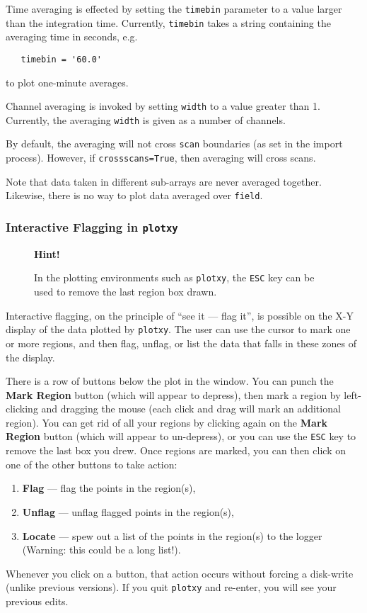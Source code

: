 Time averaging is effected by setting the {\tt timebin} parameter to a
value larger than the integration time.  Currently, {\tt timebin}
takes a string containing the averaging time in seconds, e.g.
\small
\begin{verbatim}
   timebin = '60.0'
\end{verbatim}
\normalsize
to plot one-minute averages.

Channel averaging is invoked by setting {\tt width} to a value greater
than 1.  Currently, the averaging {\tt width} is given as a number of
channels.

By default, the averaging will not cross {\tt scan} boundaries (as set
in the import process).  However, if {\tt crossscans=True}, then
averaging will cross scans.  

Note that data taken in different sub-arrays are never averaged
together. Likewise, there is no way to plot data averaged over {\tt field}.

\subsubsection{Interactive Flagging in {\tt plotxy}}
\label{section:edit.plot.plotxy.flag}

\begin{wrapfigure}{r}{2.5in}
  \begin{boxedminipage}{2.5in}
     \centerline{\bf Hint!}
     In the plotting environments such as {\tt plotxy}, the
     {\tt ESC} key can be used to remove the last region box
     drawn. 
  \end{boxedminipage}
\end{wrapfigure}

Interactive flagging, on the principle of ``see it --- flag it'', is
possible on the X-Y display of the data plotted by {\tt plotxy}.  The user can
use the cursor to mark one or more regions, and then flag, unflag, or list
the data that falls in these zones of the display.

There is a row of buttons below the plot in the window.  You can punch the
{\bf Mark Region} button (which will appear to depress), then mark a region
by left-clicking and dragging the mouse (each click and drag will mark an
additional region).  You can get rid of all your regions by clicking again
on the {\bf Mark Region} button (which will appear to un-depress), or you
can use the {\tt ESC} key to remove the last box you drew.  Once regions are
marked, you can then click on one of the other buttons to take action:
\begin{enumerate}
\item {\bf Flag} --- flag the points in the region(s),
\item {\bf Unflag} --- unflag flagged points in the region(s),
\item {\bf Locate} --- spew out a list of the points in the region(s) to 
   the logger (Warning: this could be a long list!).
\end{enumerate}
Whenever you click on a button, that action occurs without 
forcing a disk-write (unlike previous versions).  If you quit {\tt plotxy}
and re-enter, you will see your previous edits.

